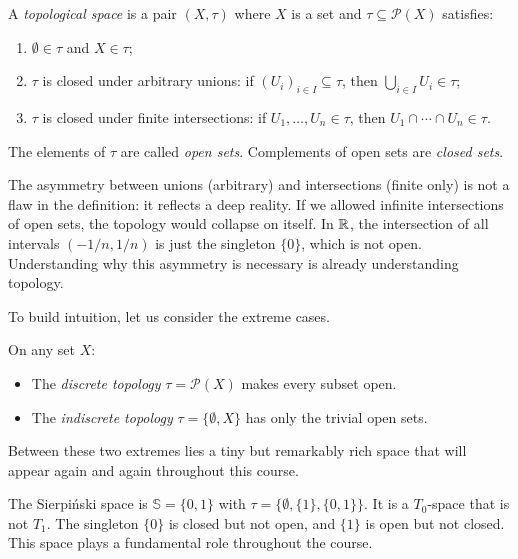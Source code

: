 \begin{definition}
A \emph{topological space} is a pair $(X,\tau)$ where $X$ is a set and
$\tau \subseteq \mathcal{P}(X)$ satisfies:
\begin{enumerate}
  \item $\emptyset \in \tau$ and $X \in \tau$;
  \item $\tau$ is closed under arbitrary unions: if $(U_i)_{i\in I} \subseteq \tau$,
    then $\bigcup_{i\in I} U_i \in \tau$;
  \item $\tau$ is closed under finite intersections: if $U_1,\ldots,U_n \in \tau$, then
    $U_1 \cap \cdots \cap U_n \in \tau$.
\end{enumerate}
The elements of $\tau$ are called \emph{open sets}. Complements of open sets are
\emph{closed sets}.
\end{definition}

The asymmetry between unions (arbitrary) and intersections (finite only) is
not a flaw in the definition: it reflects a deep reality. If we allowed
infinite intersections of open sets, the topology would collapse on itself.
In $\mathbb{R}$, the intersection of all intervals $(-1/n, 1/n)$ is just the
singleton $\{0\}$, which is not open. Understanding why this asymmetry is
necessary is already understanding topology.

To build intuition, let us consider the extreme cases.

\begin{example}
On any set $X$:
\begin{itemize}
  \item The \emph{discrete topology} $\tau = \mathcal{P}(X)$ makes every subset open.
  \item The \emph{indiscrete topology} $\tau = \{\emptyset, X\}$ has only the trivial
    open sets.
\end{itemize}
\end{example}

Between these two extremes lies a tiny but remarkably rich space that will
appear again and again throughout this course.

\begin{example}\label{ex:sierpinski}
The Sierpi\'nski space is $\mathbb{S} = \{0,1\}$ with $\tau = \{\emptyset, \{1\},
\{0,1\}\}$. It is a $T_0$-space that is not $T_1$. The singleton $\{0\}$ is closed but
not open, and $\{1\}$ is open but not closed. This space plays a fundamental role
throughout the course.
\end{example}

